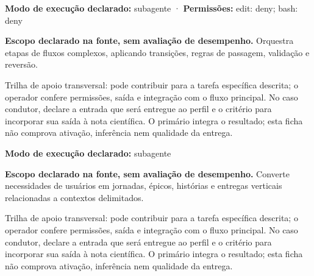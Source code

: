 \begin{arquitetura}
\textbf{Modo de execução declarado:} subagente · \textbf{Permissões:} edit: deny; bash: deny
\end{arquitetura}


\begin{descricao}
\textbf{Escopo declarado na fonte, sem avaliação de desempenho.}
Orquestra etapas de fluxos complexos, aplicando transições, regras de passagem, validação e reversão.
\end{descricao}

\begin{funcao}
Trilha de apoio transversal: pode contribuir para a tarefa específica descrita; o operador confere permissões, saída e integração com o fluxo principal. No caso condutor, declare a entrada que será entregue ao perfil e o critério para incorporar sua saída à nota científica. O primário integra o resultado; esta ficha não comprova ativação, inferência nem qualidade da entrega.
\end{funcao}

\begin{arquitetura}
\textbf{Modo de execução declarado:} subagente
\end{arquitetura}


\begin{descricao}
\textbf{Escopo declarado na fonte, sem avaliação de desempenho.}
Converte necessidades de usuários em jornadas, épicos, histórias e entregas verticais relacionadas a contextos delimitados.
\end{descricao}

\begin{funcao}
Trilha de apoio transversal: pode contribuir para a tarefa específica descrita; o operador confere permissões, saída e integração com o fluxo principal. No caso condutor, declare a entrada que será entregue ao perfil e o critério para incorporar sua saída à nota científica. O primário integra o resultado; esta ficha não comprova ativação, inferência nem qualidade da entrega.
\end{funcao}

